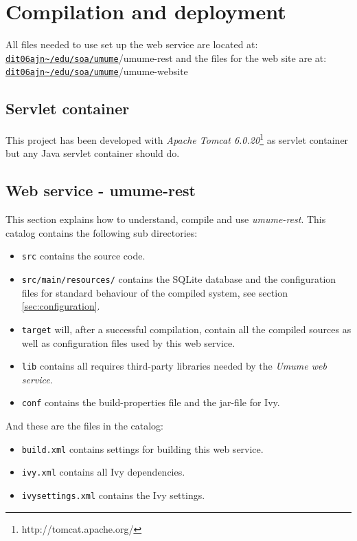 \documentclass[titlepage, twocolumn, a4paper, 10pt]{article}
\def\pathtocode{\url{dit06ajn~/edu/soa/umume}}
\begin{document}

\section{Compilation and deployment}\label{sec:compile}

All files needed to use set up the web service are located at:\\
\texttt{\pathtocode}/umume-rest and the files for the web site are at:\\
\texttt{\pathtocode}/umume-website


\subsection{Servlet container}\label{sec:usage-servlet-container}
This project has been developed with \textit{Apache Tomcat 6.0.20}\footnote{http://tomcat.apache.org/} as servlet container but any Java servlet 
container should do.

\subsection{Web service - umume-rest}
This section explains how to understand, compile and use
\textit{umume-rest}.
This catalog contains the following sub directories:
\begin{itemize}
\item \verb!src! contains the source code.
\item \verb!src/main/resources/! contains the SQLite database and 
the configuration
  files for standard behaviour of the compiled system, see section
  \ref{sec:configuration}. 
\item \verb!target! will, after a successful compilation,
  contain all the compiled sources as well as configuration files used
  by this web service.
\item \verb!lib! contains all requires third-party libraries
  needed by the \textit{Umume web service}.
\item \verb!conf! contains the build-properties file and the jar-file for Ivy.
\end{itemize}

And these are the files in the catalog:
\begin{itemize}
\item \verb!build.xml! contains settings for building this web service.
\item \verb!ivy.xml! contains all Ivy dependencies. 
\item \verb!ivysettings.xml! contains the Ivy settings. 
\end{itemize}
\end{document}
